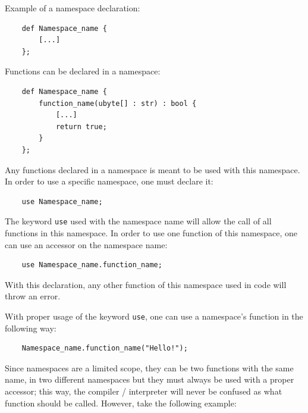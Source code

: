 \documentclass{scrartcl}
\begin{document}
            Example of a namespace declaration:
            \begin{lstlisting}
    def Namespace_name {
        [...]
    };
            \end{lstlisting}
            Functions can be declared in a namespace:
            \begin{lstlisting}
    def Namespace_name {
        function_name(ubyte[] : str) : bool {
            [...]
            return true;
        }
    };
            \end{lstlisting}
            Any functions declared in a namespace is meant to be used with this
            namespace. In order to use a specific namespace, one must declare it:
            \begin{lstlisting}
    use Namespace_name;
            \end{lstlisting}
            The keyword \texttt{use} used with the namespace name will allow
            the call of all functions in this namespace. In order to use one
            function of this namespace, one can use an accessor on the namespace name:
            \begin{lstlisting}
    use Namespace_name.function_name;
            \end{lstlisting}
            With this declaration, any other function of this namespace used in
            code will throw an error.

            With proper usage of the keyword \texttt{use}, one can use a
            namespace's function in the following way:
            \begin{lstlisting}
    Namespace_name.function_name("Hello!");
            \end{lstlisting}

            Since namespaces are a limited scope, they can be two functions with
            the same name, in two different namespaces but they must always be used
            with a proper accessor; this way, the compiler / interpreter will
            never be confused as what function should be called.
            However, take the following example:
\end{document}
